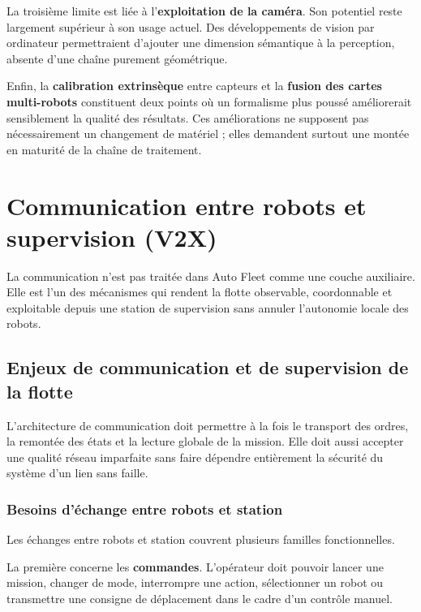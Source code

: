 \documentclass[11pt,a4paper]{report}
\newcommand{\kw}[1]{\textbf{#1}}
\begin{document}
La troisième limite est liée à l’\kw{exploitation de la caméra}. Son potentiel reste largement supérieur à son usage actuel. Des développements de vision par ordinateur permettraient d’ajouter une dimension sémantique à la perception, absente d’une chaîne purement géométrique.

Enfin, la \kw{calibration extrinsèque} entre capteurs et la \kw{fusion des cartes multi-robots} constituent deux points où un formalisme plus poussé améliorerait sensiblement la qualité des résultats. Ces améliorations ne supposent pas nécessairement un changement de matériel ; elles demandent surtout une montée en maturité de la chaîne de traitement.



\iffalse
\chapter{Communication entre robots et supervision (V2X)}

La communication n’est pas traitée dans Auto Fleet comme une couche auxiliaire. Elle est l’un des mécanismes qui rendent la flotte observable, coordonnable et exploitable depuis une station de supervision sans annuler l’autonomie locale des robots.

\section{Enjeux de communication et de supervision de la flotte}

L’architecture de communication doit permettre à la fois le transport des ordres, la remontée des états et la lecture globale de la mission. Elle doit aussi accepter une qualité réseau imparfaite sans faire dépendre entièrement la sécurité du système d’un lien sans faille.

\subsection{Besoins d’échange entre robots et station}

Les échanges entre robots et station couvrent plusieurs familles fonctionnelles.

La première concerne les \kw{commandes}. L’opérateur doit pouvoir lancer une mission, changer de mode, interrompre une action, sélectionner un robot ou transmettre une consigne de déplacement dans le cadre d’un contrôle manuel.
\end{document}
